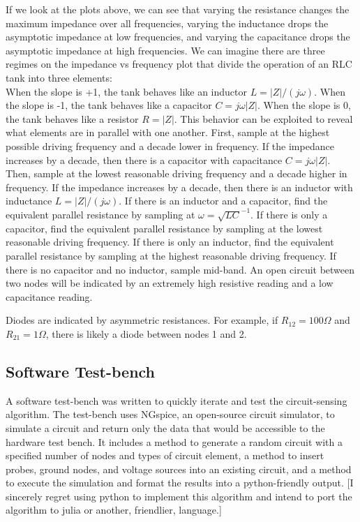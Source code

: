 \documentclass[11pt, a4paper]{article}
\begin{document}
If we look at the plots above, we can see that varying the resistance changes the maximum impedance over all frequencies, varying the inductance drops the asymptotic impedance at low frequencies, and varying the capacitance drops the asymptotic impedance at high frequencies.
We can imagine there are three regimes on the impedance vs frequency plot that divide the operation of an RLC tank into three elements:\\
When the slope is +1, the tank behaves like an inductor 
$L=|Z|/(j\omega)$.
When the slope is -1, the tank behaves like a capacitor
$C=j\omega |Z|$.
When the slope is 0, the tank behaves like a resistor
$R=|Z|$.
This behavior can be exploited to reveal what elements are in parallel with one another.
First, sample at the highest possible driving frequency and a decade lower in frequency.
If the impedance increases by a decade, then there is a capacitor with capacitance $C=j\omega |Z|$.
Then, sample at the lowest reasonable driving frequency and a decade higher in frequency.
If the impedance increases by a decade, then there is an inductor with inductance $L=|Z|/(j\omega)$.
If there is an inductor and a capacitor, find the equivalent parallel resistance by sampling at $\omega=\sqrt{LC}^{-1}$.
If there is only a capacitor, find the equivalent parallel resistance by sampling at the lowest reasonable driving frequency.
If there is only an inductor, find the equivalent parallel resistance by sampling at the highest reasonable driving frequency.
If there is no capacitor and no inductor, sample mid-band.
An open circuit between two nodes will be indicated by an extremely high resistive reading and a low capacitance reading.

Diodes are indicated by asymmetric resistances.
For example, if $R_{12}=100\Omega$ and $R_{21}=1\Omega$, there is likely a diode between nodes 1 and 2.

\subsection{Software Test-bench}

A software test-bench was written to quickly iterate and test the circuit-sensing algorithm.
The test-bench uses NGspice, an open-source circuit simulator, to simulate a circuit and return only the data that would be accessible to the hardware test bench.
It includes a method to generate a random circuit with a specified number of nodes and types of circuit element, a method to insert probes, ground nodes, and voltage sources into an existing circuit, and a method to execute the simulation and format the results into a python-friendly output.
[I sincerely regret using python to implement this algorithm and intend to port the algorithm to julia or another, friendlier, language.]
\end{document}
